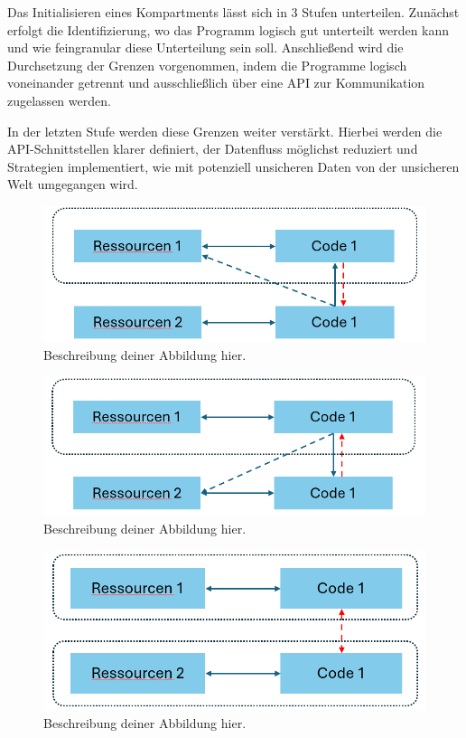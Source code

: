 Das Initialisieren eines Kompartments lässt sich in 3 Stufen unterteilen. Zunächst erfolgt die Identifizierung, wo das Programm logisch gut unterteilt werden kann und wie feingranular diese Unterteilung sein soll. Anschließend wird die Durchsetzung der Grenzen vorgenommen, indem die Programme logisch voneinander getrennt und ausschließlich über eine API zur Kommunikation zugelassen werden. 

In der letzten Stufe werden diese Grenzen weiter verstärkt. Hierbei werden die API-Schnittstellen klarer definiert, der Datenfluss möglichst reduziert und Strategien implementiert, wie mit potenziell unsicheren Daten von der unsicheren Welt umgegangen wird.

\begin{figure}[h]
    \centering
    \includegraphics[width=\linewidth]{Grafiken/Sandbox.png}
    \caption{Beschreibung deiner Abbildung hier.}
    \label{fig:sandbox}
\end{figure}
\begin{figure}[h]
    \centering
    \includegraphics[width=\linewidth]{Grafiken/Safebox.png}
    \caption{Beschreibung deiner Abbildung hier.}
    \label{fig:Safebox}
\end{figure}
\begin{figure}[h]
    \centering
    \includegraphics[width=\linewidth]{Grafiken/Kompartiment.png}
    \caption{Beschreibung deiner Abbildung hier.}
    \label{fig:Kompartment}
\end{figure}

